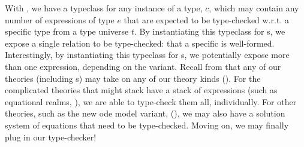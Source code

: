 With , we have a typeclass for any instance of a
type, \(c\), which may contain any number of expressions of type \(e\) that are
expected to be type-checked w.r.t. a specific type from a type universe \(t\).
By instantiating this typeclass for \DataDefinition{}s, we expose a single
relation to be type-checked: that a specific \QDefinition{} is well-formed.
Interestingly, by instantiating this typeclass for \InstanceModel{}s, we
potentially expose more than one expression, depending on the \ModelKind{}
variant. Recall from  that any of our theories (including
\InstanceModel{}s) may take on any of our theory kinds (\ModelKinds{}). For the
complicated theories that might stack have a stack of expressions (such as
equational realms,
),
we are able to type-check them all, individually. For other theories, such as
the new \acs{ode} model variant, \NewDEModel{} (\DifferentialModel{}), we may
also have a solution system of equations \cite{Chen2022MEng} that need to be
type-checked. Moving on, we may finally plug in our type-checker!

